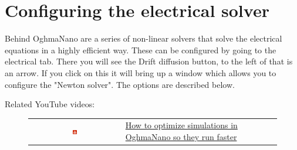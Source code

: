 \newpage
\section{Configuring the electrical solver}
\label{sec:solverconfig}


Behind OghmaNano are a series of non-linear solvers that solve the electrical equations in a highly efficient way.  These can be configured by going to the electrical tab. There you will see the Drift diffusion button, to the left of that is an arrow. If you click on this it will bring up a window which allows you to configure the "Newton solver". The options are described below.

Related YouTube videos:
\begin{figure}[H]

\begin{tabular}{ c l }

\includegraphics[width=0.05\textwidth]{./images/youtube.png}

&
\href{https://www.youtube.com/watch?v=D2WG1_wTbdc}{How to optimize simulations in OghmaNano so they run faster}

\end{tabular}
\end{figure}

